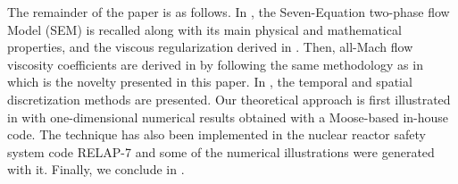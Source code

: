 \documentclass[preprint,10pt]{elsarticle}
\begin{document}
%
%
The remainder of the paper is as follows. In , the Seven-Equation two-phase flow Model (SEM) is recalled along with its main 
physical and mathematical properties, and the viscous regularization derived in \cite{Marco_paper_sem}. Then, all-Mach flow viscosity coefficients are derived 
in  by following the same methodology as in \cite{DelchiniCompFluid2014-euler} which is the novelty presented in this paper. In , the temporal and spatial discretization methods are presented. 
Our theoretical approach is first illustrated in  with one-dimensional numerical results obtained with a Moose-based in-house code. The technique has also been implemented in the nuclear 
reactor safety system code RELAP-7 \cite{Berry_2014} and some of the numerical illustrations were generated with it.
Finally, we conclude in .
%

%
\end{document}
